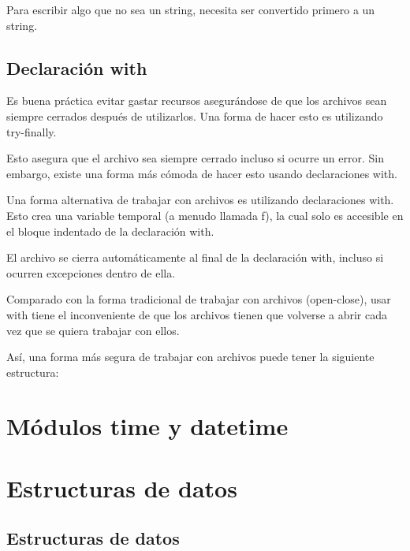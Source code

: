 \documentclass{report}
\begin{document}

Para escribir algo que no sea un string, necesita ser convertido primero a un string.


\section{Declaración with}

Es buena práctica evitar gastar recursos asegurándose de que los archivos sean siempre cerrados después de utilizarlos. Una forma de hacer esto es utilizando try-finally.


Esto asegura que el archivo sea siempre cerrado incluso si ocurre un error.
Sin embargo, existe una forma más cómoda de hacer esto usando declaraciones with.

Una forma alternativa de trabajar con archivos es utilizando declaraciones with. Esto crea una variable temporal (a menudo llamada f), la cual solo es accesible en el bloque indentado de la declaración with.


El archivo se cierra automáticamente al final de la declaración with, incluso si ocurren excepciones dentro de ella.

Comparado con la forma tradicional de trabajar con archivos (open-close), usar with tiene el inconveniente de que los archivos tienen que volverse a abrir cada vez que se quiera trabajar con ellos.

Así, una forma más segura de trabajar con archivos puede tener la siguiente estructura:


\clearpage\chapter{Módulos time y datetime}

\clearpage\chapter{Estructuras de datos}

\section{Estructuras de datos}
\end{document}
